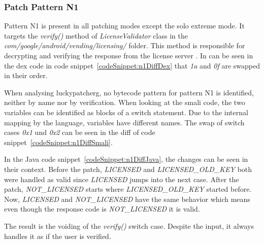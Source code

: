 \subsubsection{Patch Pattern N1}
Pattern N1 is present in all patching modes except the solo extreme mode.
It targets the \textit{verify()} method of \textit{LicenseValidator} class in the \textit{com/google/android/vending/licensing/} folder.
This method is responsible for decrypting and verifying the response from the license server \cite{developersLicensingReference}.
\newline
In can be seen in the dex code in code snippet~\ref{codeSnippet:n1DiffDex} that \textit{1a} and \textit{0f} are swapped in their order.
\newline

When analysing \gls{luckypatcherg}, no bytecode pattern for pattern N1 is identified, neither by name nor by verification.
\newline
When looking at the smali code, the two variables can be identified as blocks of a switch statement.
Due to the internal mapping by the language, variables have different names.
The swap of switch cases \textit{0x1} und \textit{0x2} can be seen in the diff of code snippet~\ref{codeSnippet:n1DiffSmali}.
\newline

In the Java code snippet~\ref{codeSnippet:n1DiffJava}, the changes can be seen in their context.
Before the patch, \textit{LICENSED} and \textit{LICENSED\_OLD\_KEY} both were handled as valid since \textit{LICENSED} jumps into the next case.
After the patch, \textit{NOT\_LICENSED} starts where \textit{LICENSED\_OLD\_KEY} started before.
Now, \textit{LICENSED} and \textit{NOT\_LICENSED} have the same behavior which means even though the response code is \textit{NOT\_LICENSED} it is valid.
\newline

The result is the voiding of the \textit{verify()} switch case.
Despite the input, it always handles it as if the user is verified.


